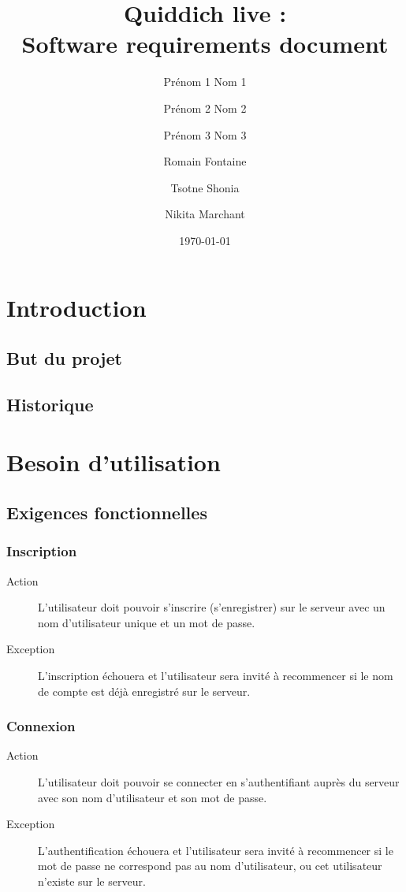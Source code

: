 \documentclass[a4paper]{article}
\title{Quiddich live : \\Software requirements document}
\author{Prénom 1 Nom 1 \and Prénom 2 Nom 2 \and Prénom 3 Nom 3 \and
Romain Fontaine \and Tsotne Shonia \and Nikita Marchant}
\date{\today}
\begin{document}
\maketitle

\section{Introduction}
\subsection{But du projet}

\printglossary[numberedsection]
\subsection{Historique}

\section{Besoin d'utilisation}
\subsection{Exigences fonctionnelles}

\subsubsection{Inscription}
\begin{description}
\item[Action] L'\gls{utilisateur} doit pouvoir s'inscrire (s'enregistrer) sur le \gls{serveur} avec un nom d'utilisateur unique et un mot de passe.
\item[Exception] L'inscription échouera et l'\gls{utilisateur} sera invité à recommencer si le nom de compte est déjà enregistré sur le serveur.
\end{description}

\subsubsection{Connexion}
\begin{description}
\item[Action] L'\gls{utilisateur} doit pouvoir se connecter en s'authentifiant auprès du \gls{serveur} avec son nom d'utilisateur et son mot de passe.
\item[Exception] L'authentification échouera et l'\gls{utilisateur} sera invité à recommencer si le mot de passe ne correspond pas au nom d'utilisateur, ou cet \gls{utilisateur} n'existe sur le \gls{serveur}.
\end{description}
\end{document}
